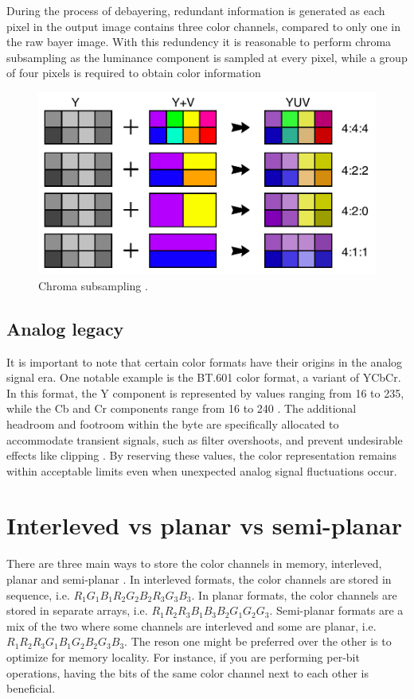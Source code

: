 During the process of debayering, redundant information is generated as each pixel in the output image contains three color channels, compared to only one in the raw bayer image.
With this redundency it is reasonable to perform chroma subsampling as the luminance component is sampled at every pixel, while a group of four pixels is required to obtain color information

\begin{figure}[H]
    \centering
    \includegraphics[width=.6\textwidth]{figures/debayer/chroma_subsampling.pdf}
    \caption{Chroma subsampling \cite{stevo-88EnglishMostWidely2010}.}
    \label{fig:chroma_subsampling}
\end{figure}


\subsection{Analog legacy}
It is important to note that certain color formats have their origins in the analog signal era.
One notable example is the BT.601 color format, a variant of YCbCr.
In this format, the Y component is represented by values ranging from 16 to 235, while the Cb and Cr components range from 16 to 240 \cite{YCbCr2023}.
The additional headroom and footroom within the byte are specifically allocated to accommodate transient signals, such as filter overshoots, and prevent undesirable effects like clipping \cite{Rec6012023}.
By reserving these values, the color representation remains within acceptable limits even when unexpected analog signal fluctuations occur.


\section{Interleved vs planar vs semi-planar}
There are three main ways to store the color channels in memory, interleved, planar and semi-planar \cite{baranYUVFormats2018}.
In interleved formats, the color channels are stored in sequence, i.e.
$R_1 G_1 B_1 R_2 G_2 B_2 R_3 G_3 B_3$.
In planar formats, the color channels are stored in separate arrays, i.e.
$R_1 R_2 R_3 B_1 B_3 B_2 G_1 G_2 G_3$.
Semi-planar formats are a mix of the two where some channels are interleved and some are planar, i.e.
$R_1 R_2 R_3 G_1 B_1 G_2 B_2 G_3 B_3$.
The reson one might be preferred over the other is to optimize for memory locality.
For instance, if you are performing per-bit operations, having the bits of the same color channel next to each other is beneficial.


